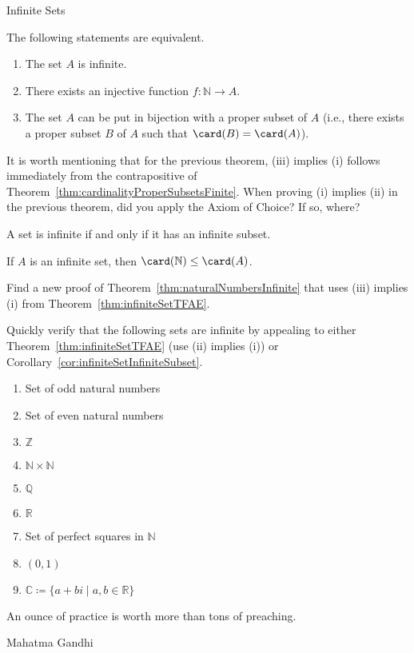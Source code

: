 \begin{section}{Infinite Sets}
\begin{theorem}\label{thm:infiniteSetTFAE}
The following statements are equivalent.
\begin{enumerate}[label=\textrm{(\roman*)}]
\item The set $A$ is infinite.
\item There exists an injective function $f:\mathbb{N}\to A$.
\item The set $A$ can be put in bijection with a proper subset of $A$ (i.e., there exists a proper subset $B$ of $A$ such that $\card(B)=\card(A)$).
\end{enumerate}
\end{theorem}

It is worth mentioning that for the previous theorem, (iii) implies (i) follows immediately from the contrapositive of Theorem~\ref{thm:cardinalityProperSubsetsFinite}. When proving (i) implies (ii) in the previous theorem, did you apply the Axiom of Choice?  If so, where? 

\begin{corollary}\label{cor:infiniteSetInfiniteSubset}
A set is infinite if and only if it has an infinite subset.
\end{corollary}

\begin{corollary}\label{cor:card(N) less than or equal to infinite set}
If $A$ is an infinite set, then $\card(\mathbb{N})\leq \card(A)$.
\end{corollary}

\begin{problem}
Find a new proof of Theorem~\ref{thm:naturalNumbersInfinite} that uses (iii) implies (i) from Theorem~\ref{thm:infiniteSetTFAE}.
\end{problem}

\begin{problem}\label{prob:moreInfiniteSets}
Quickly verify that the following sets are infinite by appealing to either Theorem~\ref{thm:infiniteSetTFAE} (use (ii) implies (i)) or Corollary~\ref{cor:infiniteSetInfiniteSubset}.
\begin{enumerate}[label=\textrm{(\alph*)}]
\item Set of odd natural numbers
\item Set of even natural numbers
\item $\mathbb{Z}$
\item $\mathbb{N}\times \mathbb{N}$
\item $\mathbb{Q}$
\item $\mathbb{R}$
\item Set of perfect squares in $\mathbb{N}$
\item $(0,1)$
\item $\mathbb{C}\coloneqq \{a+bi\mid a,b\in\mathbb{R}\}$
\end{enumerate}
\end{problem}

\epigraph{An ounce of practice is worth more than tons of preaching.}{Mahatma Gandhi}

\end{section}